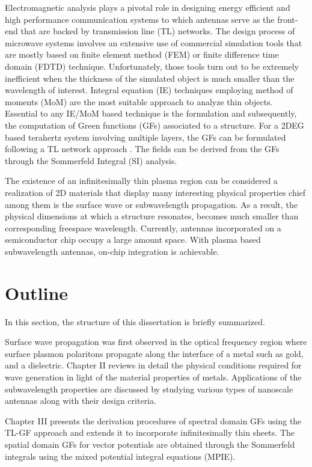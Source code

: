 \documentclass[12pt]{article}
\begin{document}
Electromagnetic analysis plays a pivotal role in designing energy efficient and high performance communication systems to which antennas serve as the front-end that are backed by transmission line (TL) networks. The design process of microwave systems involves an extensive use of commercial simulation tools that are mostly based on finite element method (FEM) or finite difference time domain (FDTD) technique. Unfortunately, those tools turn out to be extremely inefficient when the thickness of the simulated object is much smaller than the wavelength of interest. Integral equation (IE) techniques employing method of moments (MoM) are the most suitable approach to analyze thin objects. Essential to any IE/MoM based technique is the formulation and subsequently, the computation of Green functions (GFs) associated to a structure. For a 2DEG based terahertz system involving multiple layers, the GFs can be formulated following a TL network approach \cite{Michalski1997}. The fields can be derived from the GFs through the Sommerfeld Integral (SI) analysis.

The existence of an infinitesimally thin plasma region can be considered a realization of 2D materials that display many interesting physical properties chief among them is the surface wave or subwavelength propagation. As a result, the physical dimensions at which a structure resonates, becomes much smaller than corresponding freespace wavelength. Currently, antennas incorporated on a semiconductor chip occupy a large amount space. With plasma based subwavelength antennas, on-chip integration is achievable.
\section{Outline}
%
In this section, the structure of this dissertation is briefly summarized.

Surface wave propagation was first observed in the optical frequency region where surface plasmon polaritons propagate along the interface of a metal such as gold, and a dielectric. Chapter II reviews in detail the physical conditions required for wave generation in light of the material properties of metals. Applications of the subwavelength properties are discussed by studying various types of nanoscale antennas along with their design criteria.

Chapter III presents the derivation procedures of spectral domain GFs using the TL-GF approach \cite{Michalski1997,Michalski2005} and extends it to incorporate infinitesimally thin sheets. The spatial domain GFs for vector potentials are obtained through the Sommerfeld integrals using the mixed potential integral equations (MPIE).
\end{document}
